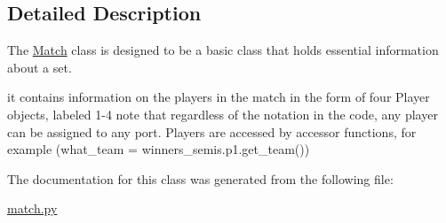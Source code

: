 \subsection{Detailed Description}
The \hyperlink{classssbm-py_1_1match_1_1_match}{Match} class is designed to be a basic class that holds essential information about a set. 

it contains information on the players in the match in the form of four Player objects, labeled 1-\/4 note that regardless of the notation in the code, any player can be assigned to any port. Players are accessed by accessor functions, for example (what\+\_\+team = winners\+\_\+semis.\+p1.\+get\+\_\+team()) 

The documentation for this class was generated from the following file\+:\begin{DoxyCompactItemize}
\item 
\hyperlink{match_8py}{match.\+py}\end{DoxyCompactItemize}
